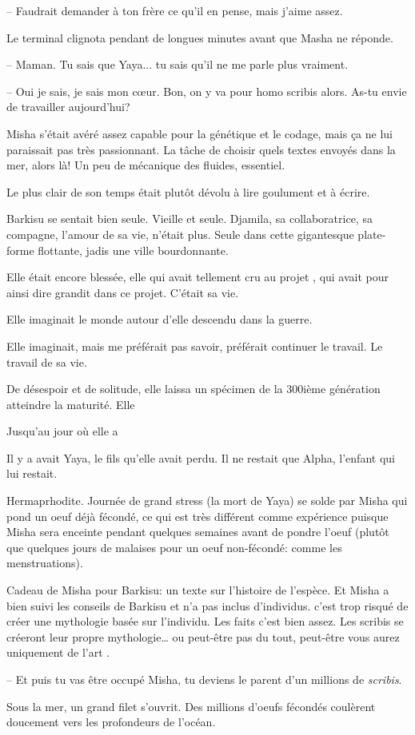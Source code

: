 -- Faudrait demander à ton frère ce qu'il en pense, mais j'aime assez.

Le terminal clignota pendant de longues minutes avant que Masha ne réponde. 

-- Maman. Tu sais que Yaya... tu sais qu'il ne me parle plus vraiment.

-- Oui je sais, je sais mon c\oe ur. Bon, on y va pour homo scribis alors. As-tu envie de travailler aujourd'hui?

Misha s'était avéré assez capable pour la génétique et le codage, mais ça ne lui paraissait pas très passionnant.
La tâche de choisir quels textes envoyés dans la mer, alors là!
Un peu de mécanique des fluides, essentiel.

Le plus clair de son temps était plutôt dévolu à lire goulument et à écrire.

Barkisu se sentait bien seule. Vieille et seule.
Djamila, sa collaboratrice, sa compagne, l'amour de sa vie, n'était plus.
Seule dans cette gigantesque plate-forme flottante, jadis une ville bourdonnante.

Elle était encore blessée, elle qui avait tellement cru au projet \nomProjet{},
qui avait pour ainsi dire grandit dans ce projet. C'était sa vie.

Elle imaginait le monde autour d'elle descendu dans la guerre.

Elle imaginait, mais me préférait pas savoir, préférait continuer le travail.
Le travail de sa vie. 

De désespoir et de solitude, elle laissa un spécimen de la 300ième génération atteindre la maturité.
Elle 

Jusqu'au jour où elle a 

Il y a avait Yaya, le fils qu'elle avait perdu.
Il ne restait que Alpha, l'enfant qui lui restait.

\sautSection{}

Hermaprhodite. Journée de grand stress (la mort de Yaya) se solde par Misha qui pond un oeuf déjà fécondé, ce qui est très différent comme expérience puisque Misha sera enceinte pendant quelques semaines avant de pondre l'oeuf (plutôt que quelques jours de malaises pour un oeuf non-fécondé: comme les menstruations).

\sautSection{}

Cadeau de Misha pour Barkisu: un texte sur l'histoire de l'espèce. Et Misha a bien suivi les conseils de Barkisu et n'a pas inclus d'individus. \og c'est trop risqué de créer une mythologie basée sur l'individu. Les faits c'est bien assez. 
Les scribis se créeront leur propre mythologie\ldots{} ou peut-être pas du tout, peut-être vous aurez uniquement de l'art \fg{}.

\sautSection{}

-- Et puis tu vas être occupé Misha, tu deviens le parent d'un millions de \textit{scribis}.

Sous la mer, un grand filet s'ouvrit. Des millions d'oeufs fécondés coulèrent
doucement vers les profondeurs de l'océan.


